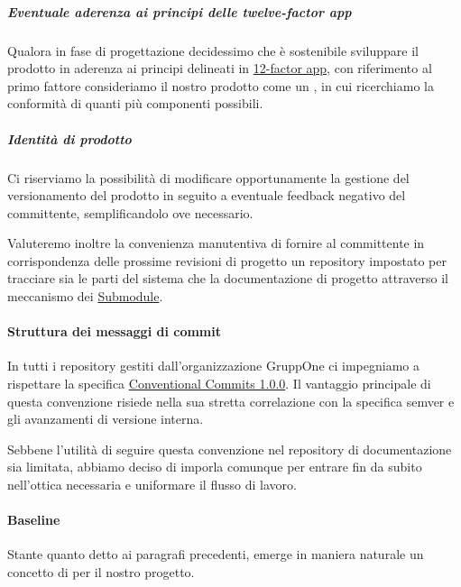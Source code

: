 \documentclass[../../norme-di-progetto.tex]{subfiles}
\begin{document}
\subparagraph{Eventuale aderenza ai principi delle twelve-factor app}%
\label{subp:eventuale_aderenza_ai_principi_delle_twelve-factor_app}

Qualora in fase di progettazione decidessimo che è sostenibile sviluppare il prodotto in aderenza ai principi delineati in \href{https://12factor.net/codebase}{12-factor app}, con riferimento al primo fattore consideriamo il nostro prodotto come un , in cui ricerchiamo la conformità di quanti più componenti possibili.

\subparagraph{Identità di prodotto}%
\label{subp:identita_di_prodotto}

Ci riserviamo la possibilità di modificare opportunamente la gestione del versionamento del prodotto in seguito a eventuale feedback negativo del committente, semplificandolo ove necessario.

Valuteremo inoltre la convenienza manutentiva di fornire al committente in corrispondenza delle prossime revisioni di progetto un repository impostato per tracciare sia le parti del sistema che la documentazione di progetto attraverso il meccanismo dei \href{https://git-scm.com/book/en/v2/Git-Tools-Submodules}{Submodule}.


\paragraph{Struttura dei messaggi di commit}%
\label{par:struttura_dei_messaggi_di_commit}

In tutti i repository gestiti dall'organizzazione GruppOne ci impegniamo a rispettare la specifica \href{https://www.conventionalcommits.org/en/v1.0.0/}{Conventional Commits 1.0.0}. Il vantaggio principale di questa convenzione risiede nella sua stretta correlazione con la specifica semver e gli avanzamenti di versione interna.

Sebbene l'utilità di seguire questa convenzione nel repository di documentazione sia limitata, abbiamo deciso di imporla comunque per entrare fin da subito nell'ottica necessaria e uniformare il flusso di lavoro.

\paragraph{Baseline}%
\label{par:baseline}

Stante quanto detto ai paragrafi precedenti, emerge in maniera naturale un concetto di  per il nostro progetto.
\end{document}
